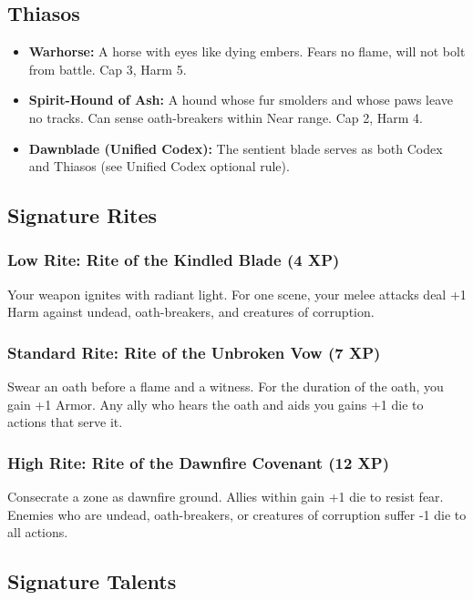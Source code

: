 \subsection{Thiasos}

\begin{itemize}
\item \textbf{Warhorse:} A horse with eyes like dying embers. Fears no flame, will not bolt from battle. Cap 3, Harm 5.
\item \textbf{Spirit-Hound of Ash:} A hound whose fur smolders and whose paws leave no tracks. Can sense oath-breakers within Near range. Cap 2, Harm 4.
\item \textbf{Dawnblade (Unified Codex):} The sentient blade serves as both Codex and Thiasos (see Unified Codex optional rule).
\end{itemize}

\subsection{Signature Rites}

\subsubsection{Low Rite: Rite of the Kindled Blade (4 XP)}

Your weapon ignites with radiant light. For one scene, your melee attacks deal +1 Harm against undead, oath-breakers, and creatures of corruption.

\subsubsection{Standard Rite: Rite of the Unbroken Vow (7 XP)}

Swear an oath before a flame and a witness. For the duration of the oath, you gain +1 Armor. Any ally who hears the oath and aids you gains +1 die to actions that serve it.

\subsubsection{High Rite: Rite of the Dawnfire Covenant (12 XP)}

Consecrate a zone as dawnfire ground. Allies within gain +1 die to resist fear. Enemies who are undead, oath-breakers, or creatures of corruption suffer -1 die to all actions.

\subsection{Signature Talents}

